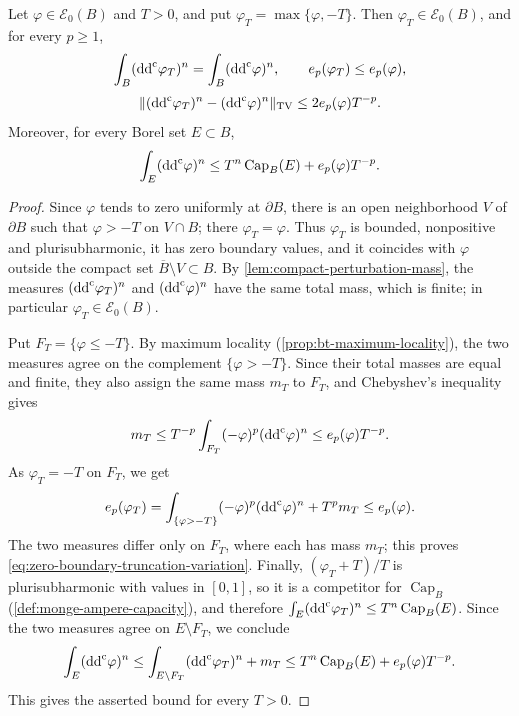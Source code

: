 \begin{lemma}\label{lem:zero-boundary-truncation-mass}
Let $\varphi\in\mathcal E_0(B)$ and $T>0$, and put $\varphi_T=\max\{\varphi,-T\}$. Then $\varphi_T\in\mathcal E_0(B)$, and for every $p\geq1$,
\[
 \int_B(\mathrm{dd}^{\mathrm{c}}\varphi_T)^n=\int_B(\mathrm{dd}^{\mathrm{c}}\varphi)^n,
 \qquad e_p(\varphi_T)\leq e_p(\varphi),
\]
\begin{equation}\label{eq:zero-boundary-truncation-variation}
 \|(\mathrm{dd}^{\mathrm{c}}\varphi_T)^n-(\mathrm{dd}^{\mathrm{c}}\varphi)^n\|_{\mathrm{TV}}
                         \leq2e_p(\varphi)T^{-p}.
\end{equation}
Moreover, for every Borel set $E\subset B$,
\begin{equation}\label{eq:energy-measure-capacity-modulus}
 \int_E(\mathrm{dd}^{\mathrm{c}}\varphi)^n
       \leq T^n\operatorname{Cap}_B(E)+e_p(\varphi)T^{-p}.
\end{equation}
\end{lemma}
\begin{proof}
Since $\varphi$ tends to zero uniformly at $\partial B$, there is an open neighborhood $V$ of $\partial B$ such that $\varphi>-T$ on $V\cap B$; there $\varphi_T=\varphi$. Thus $\varphi_T$ is bounded, nonpositive and plurisubharmonic, it has zero boundary values, and it coincides with $\varphi$ outside the compact set $\overline B\setminus V\subset B$. By \cref{lem:compact-perturbation-mass}, the measures $(\mathrm{dd}^{\mathrm{c}}\varphi_T)^n$ and $(\mathrm{dd}^{\mathrm{c}}\varphi)^n$ have the same total mass, which is finite; in particular $\varphi_T\in\mathcal E_0(B)$.

Put $F_T=\{\varphi\leq-T\}$. By maximum locality (\cref{prop:bt-maximum-locality}), the two measures agree on the complement $\{\varphi>-T\}$. Since their total masses are equal and finite, they also assign the same mass $m_T$ to $F_T$, and Chebyshev's inequality gives
\[
 m_T\leq T^{-p}\int_{F_T}(-\varphi)^p(\mathrm{dd}^{\mathrm{c}}\varphi)^n\leq e_p(\varphi)T^{-p}.
\]
As $\varphi_T=-T$ on $F_T$, we get
\[
 e_p(\varphi_T)=\int_{\{\varphi>-T\}}(-\varphi)^p(\mathrm{dd}^{\mathrm{c}}\varphi)^n+T^pm_T
 \leq e_p(\varphi).
\]
The two measures differ only on $F_T$, where each has mass $m_T$; this proves \eqref{eq:zero-boundary-truncation-variation}. Finally, $(\varphi_T+T)/T$ is plurisubharmonic with values in $[0,1]$, so it is a competitor for $\operatorname{Cap}_B$ (\cref{def:monge-ampere-capacity}), and therefore $\int_E(\mathrm{dd}^{\mathrm{c}}\varphi_T)^n\leq T^n\operatorname{Cap}_B(E)$. Since the two measures agree on $E\setminus F_T$, we conclude
\enlargethispage{\baselineskip}
\[
 \int_E(\mathrm{dd}^{\mathrm{c}}\varphi)^n
 \leq\int_{E\setminus F_T}(\mathrm{dd}^{\mathrm{c}}\varphi_T)^n+m_T
 \leq T^n\operatorname{Cap}_B(E)+e_p(\varphi)T^{-p}.
\]
This gives the asserted bound for every $T>0$.
\end{proof}

